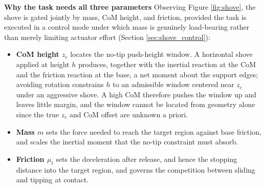 \documentclass[10pt, conference]{IEEEtran}
\begin{document}
\noindent \textbf{Why the task needs all three parameters}
Observing Figure \ref{fig:shove}, the shove is gated jointly by mass, CoM height, and friction, provided the task is executed in a control mode under which mass is genuinely load-bearing rather than merely limiting actuator effort (Section \ref{sec:shove_control}):
\begin{itemize}
  \item \textbf{CoM height $z_c$} locates the no-tip push-height window. A horizontal shove applied at height $h$ produces, together with the inertial reaction at the CoM and the friction reaction at the base, a net moment about the support edges; avoiding rotation constrains $h$ to an admissible window centered near $z_c$ under an aggressive shove. A high CoM therefore pushes the window up and leaves little margin, and the window cannot be located from geometry alone since the true $z_c$ and CoM offset are unknown a priori.
  \item \textbf{Mass $m$} sets the force needed to reach the target region against base friction, and scales the inertial moment that the no-tip constraint must absorb.
  \item \textbf{Friction $\mu_t$} sets the deceleration after release, and hence the stopping distance into the target region, and governs the competition between sliding and tipping at contact.
\end{itemize}
\end{document}
